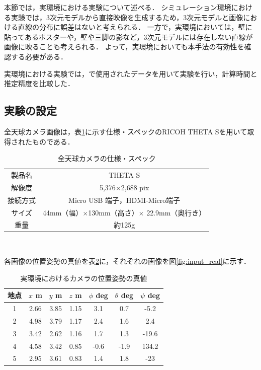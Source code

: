 本節では，実環境における実験について述べる．
シミュレーション環境における実験では，3次元モデルから直接映像を生成するため，3次元モデルと画像における直線の分布に誤差はないと考えられる．
一方で，実環境においては，壁に貼ってあるポスターや，壁や三脚の影など，3次元モデルには存在しない直線が画像に映ることも考えられる．
よって，実環境においても本手法の有効性を確認する必要がある．

\vspace{\baselineskip}
実環境における実験では，\mbox{\cite{Goto2018}}で使用されたデータを用いて実験を行い，計算時間と推定精度を比較した．


\subsection{実験の設定}

全天球カメラ画像は，表\ref{tab:spec}に示す仕様・スペックのRICOH THETA Sを用いて取得されたものである．


\begin{table}[htb]
 \begin{center}
 \caption{全天球カメラの仕様・スペック}
  \begin{tabular}{c|c} \hline
    製品名 & THETA S \\ 
    解像度 & 5,376$\times$2,688 pix \\ 
    接続方式 & Micro USB 端子，HDMI-Micro端子 \\ 
    サイズ & 44mm（幅）$\times$130mm（高さ）$\times$ 22.9mm（奥行き） \\
    重量 & 約125g \\ \hline
  \end{tabular}
　\label{tab:spec}
 \end{center}
\end{table}

各画像の位置姿勢の真値を表\ref{tab:real_pos}に，それぞれの画像を図\ref{fig:input_real}に示す．


\begin{table}[htb]
 \begin{center}
 \caption{実環境におけるカメラの位置姿勢の真値}
  \begin{tabular}{c||c|c|c|c|c|c} \hline
    地点 & $x$ m & $y$ m & $z$ m & $\phi$ deg & $\theta$ deg & $\psi$ deg \\ \hline \hline
     1 & 2.66 & 3.85 & 1.15 & 3.1 & 0.7 & -5.2  \\ 
     2 & 4.98 & 3.79 & 1.17 & 2.4 & 1.6 & 2.4  \\ 
     3 & 3.42 & 2.62 & 1.16 & 1.7 & 1.3 & -19.6  \\
     4 & 4.58 & 3.42 & 0.85 & -0.6 & -1.9 & 134.2  \\
     5 & 2.95 & 3.61 & 0.83 & 1.4 & 1.8 & -23  \\ \hline
  \end{tabular}
　\label{tab:real_pos}
 \end{center}
\end{table}


